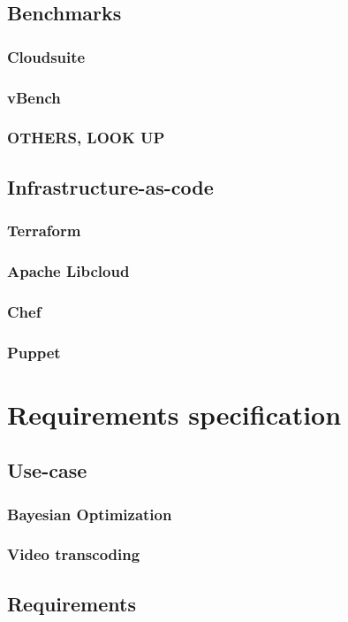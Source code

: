 \documentclass{report}
\begin{document}
\section{Benchmarks}
\subsection{Cloudsuite}
\subsection{vBench}
\subsection{OTHERS, LOOK UP}
\section{Infrastructure-as-code}
\subsection{Terraform}
\subsection{Apache Libcloud}  
\subsection{Chef}
\subsection{Puppet}
\chapter{Requirements specification}
\section{Use-case}
\subsection{Bayesian Optimization}
\subsection{Video transcoding}
\section{Requirements}
\end{document}
